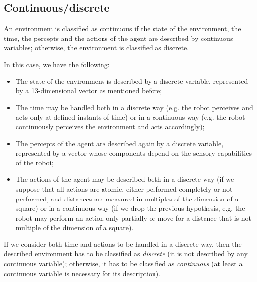 \documentclass[letterpaper,headings=standardclasses]{scrartcl}
\begin{document}
\subsection{Continuous/discrete}

An environment is classified as continuous if the state of the environment, the time, the percepts and the actions of the agent are described by continuous variables; otherwise, the environment is classified as discrete.

In this case, we have the following:

\begin{itemize}

\item The state of the environment is described by a discrete variable, represented by a 13-dimensional vector as mentioned before;
\item The time may be handled both in a discrete way (e.g. the robot perceives and acts only at defined instants of time) or in a continuous way (e.g. the robot continuously perceives the environment and acts accordingly);
\item The percepts of the agent are described again by a discrete variable, represented by a vector whose components depend on the sensory capabilities of the robot;
\item The actions of the agent may be described both in a discrete way (if we suppose that all actions are atomic, either performed completely or not performed, and distances are measured in multiples of the dimension of a square) or in a continuous way (if we drop the previous hypothesis, e.g. the robot may perform an action only partially or move for a distance that is not multiple of the dimension of a square).

\end{itemize}

If we consider both time and actions to be handled in a discrete way, then the described environment has to be classified as \emph{discrete} (it is not described by any continuous variable); otherwise, it has to be classified as \emph{continuous} (at least a continuous variable is necessary for its description).
\end{document}
